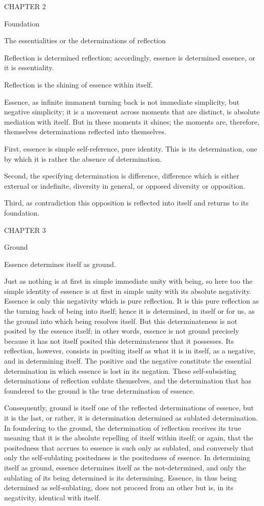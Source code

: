 CHAPTER 2

Foundation

The essentialities or the determinations of reflection

Reflection is determined reflection;
accordingly, essence is determined essence, or it is essentiality.

Reflection is the shining of essence within itself.

Essence, as infinite immanent turning back is
not immediate simplicity, but negative simplicity;
it is a movement across moments that are distinct,
is absolute mediation with itself.
But in these moments it shines;
the moments are, therefore, themselves
determinations reflected into themselves.

First, essence is simple self-reference, pure identity.
This is its determination, one by which it is rather
the absence of determination.

Second, the specifying determination is difference,
difference which is either external or indefinite,
diversity in general, or opposed diversity or opposition.

Third, as contradiction this opposition is reflected into itself
and returns to its foundation.

CHAPTER 3

Ground

Essence determines itself as ground.

Just as nothing is at first in simple immediate unity with being,
so here too the simple identity of essence is at first
in simple unity with its absolute negativity.
Essence is only this negativity which is pure reflection.
It is this pure reflection as the turning back of being into itself;
hence it is determined, in itself or for us,
as the ground into which being resolves itself.
But this determinateness is not posited by the essence itself;
in other words, essence is not ground precisely because
it has not itself posited this determinateness that it possesses.
Its reflection, however, consists in positing itself as
what it is in itself, as a negative, and in determining itself.
The positive and the negative constitute the essential determination
in which essence is lost in its negation.
These self-subsisting determinations of reflection sublate themselves,
and the determination that has foundered to the ground is
the true determination of essence.

Consequently, ground is itself one of
the reflected determinations of essence,
but it is the last, or rather,
it is determination determined as sublated determination.
In foundering to the ground, the determination of reflection
receives its true meaning that it is the absolute
repelling of itself within itself;
or again, that the positedness that accrues to essence is
such only as sublated,
and conversely that only the self-sublating positedness is
the positedness of essence.
In determining itself as ground,
essence determines itself as the not-determined,
and only the sublating of its being determined is its determining.
Essence, in thus being determined as self-sublating,
does not proceed from an other but is,
in its negativity, identical with itself.

